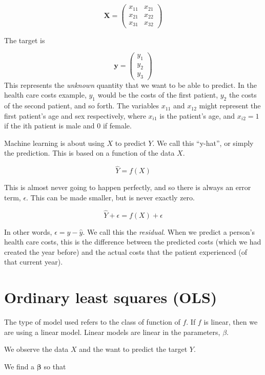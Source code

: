 \documentclass[openany]{book}
\begin{document}
\[
\mathbf{X} = \begin{pmatrix}x_{11} & x_{21}\\
x_{21} & x_{22}\\
x_{31} & x_{32}
\end{pmatrix}
\]

The target is

\[\mathbf{y} = \begin{pmatrix} y_1 \\ y_2 \\ y_3 \end{pmatrix}\]
This represents the \emph{unknown} quantity that we want to be able to predict. In the health care costs example, \(y_1\) would be the costs of the first patient, \(y_2\) the costs of the second patient, and so forth. The variables \(x_{11}\) and \(x_{12}\) might represent the first patient's age and sex respectively, where \(x_{i1}\) is the patient's age, and \(x_{i2} = 1\) if the ith patient is male and 0 if female.

Machine learning is about using \(X\) to predict \(Y\). We call this ``y-hat'', or simply the prediction. This is based on a function of the data \(X\).

\[\hat{Y} = f(X)\]

This is almost never going to happen perfectly, and so there is always an error term, \(\epsilon\). This can be made smaller, but is never exactly zero.

\[
\hat{Y} + \epsilon = f(X) + \epsilon
\]

In other words, \(\epsilon = y - \hat{y}\). We call this the \emph{residual}. When we predict a person's health care costs, this is the difference between the predicted costs (which we had created the year before) and the actual costs that the patient experienced (of that current year).

\hypertarget{ordinary-least-squares-ols}{%
\section{Ordinary least squares (OLS)}\label{ordinary-least-squares-ols}}

The type of model used refers to the class of function of \(f\). If \(f\) is linear, then we are using a linear model. Linear models are linear in the parameters, \(\beta\).

We observe the data \(X\) and the want to predict the target \(Y\).

We find a \(\mathbf{\beta}\) so that
\end{document}
